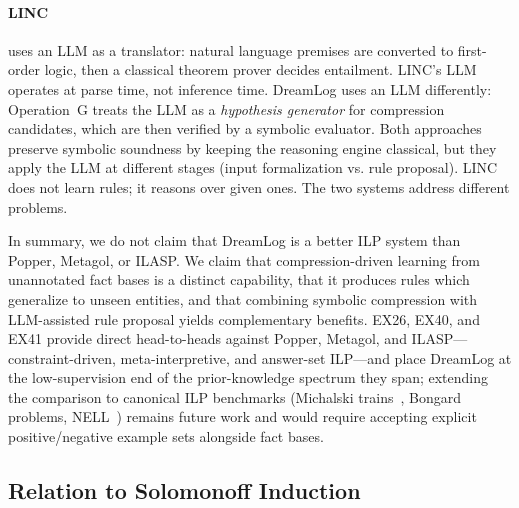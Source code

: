\documentclass[10pt,conference]{IEEEtran}
\begin{document}
\paragraph{LINC~\cite{olausson2023linc}} uses an LLM as a translator: natural language premises are converted to first-order logic, then a classical theorem prover decides entailment. LINC's LLM operates at parse time, not inference time. DreamLog uses an LLM differently: Operation~G treats the LLM as a \emph{hypothesis generator} for compression candidates, which are then verified by a symbolic evaluator. Both approaches preserve symbolic soundness by keeping the reasoning engine classical, but they apply the LLM at different stages (input formalization vs. rule proposal). LINC does not learn rules; it reasons over given ones. The two systems address different problems.

In summary, we do not claim that DreamLog is a better ILP system than Popper, Metagol, or ILASP. We claim that compression-driven learning from unannotated fact bases is a distinct capability, that it produces rules which generalize to unseen entities, and that combining symbolic compression with LLM-assisted rule proposal yields complementary benefits. EX26, EX40, and EX41 provide direct head-to-heads against Popper, Metagol, and ILASP---constraint-driven, meta-interpretive, and answer-set ILP---and place DreamLog at the low-supervision end of the prior-knowledge spectrum they span; extending the comparison to canonical ILP benchmarks (Michalski trains~\cite{muggleton1994inductive}, Bongard problems, NELL~\cite{mitchell2018never}) remains future work and would require accepting explicit positive/negative example sets alongside fact bases.

\subsection{Relation to Solomonoff Induction}
\end{document}
